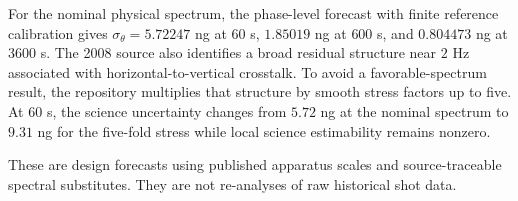 For the nominal physical spectrum, the phase-level forecast with finite reference calibration gives $\sigma_\theta=5.72247$ ng at $60$ s, $1.85019$ ng at $600$ s, and $0.804473$ ng at $3600$ s. The 2008 source also identifies a broad residual structure near $2$ Hz associated with horizontal-to-vertical crosstalk. To avoid a favorable-spectrum result, the repository multiplies that structure by smooth stress factors up to five. At $60$ s, the science uncertainty changes from $5.72$ ng at the nominal spectrum to $9.31$ ng for the five-fold stress while local science estimability remains nonzero.

These are design forecasts using published apparatus scales and source-traceable spectral substitutes. They are not re-analyses of raw historical shot data.
